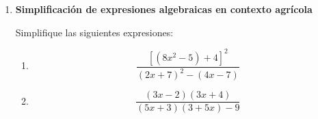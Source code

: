 \documentclass[12pt]{article}
\begin{document}
\begin{enumerate}
		\vspace{0.4cm}
		
		\item \textbf{Simplificación de expresiones algebraicas en contexto agrícola}
		
		Simplifique las siguientes expresiones:
		
		\begin{enumerate}[label=\alph*)]
			\item 
			\[
			\frac{[(8x^2-5)+4]^2}{(2x+7)^2-(4x-7)}
			\]
			
			\item
			\[
			\frac{(3x-2)(3x+4)}{(5x+3)(3+5x)-9}
			\]
		\end{enumerate}
		
	\end{enumerate}
	
\end{document}
